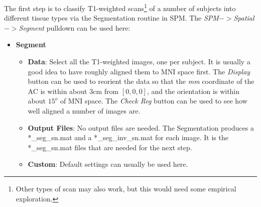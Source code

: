 The first step is to classify T1-weighted scans\footnote{Other types of scan may also work, but this would need some empirical exploration.} of a number of subjects into different tissue types via the Segmentation routine in SPM.
The \emph{SPM$->$Spatial$->$Segment} pulldown can be used here:
\begin{itemize}
\item{{\bf Segment}
  \begin{itemize}
  \item{{\bf Data}: Select all the T1-weighted images, one per subject.  It is usually a good idea to have roughly aligned them to MNI space first.  The \emph{Display} button can be used to reorient the data so that the \emph{mm} coordinate of the AC is within about 3cm from $[0, 0, 0]$, and the orientation is within about $15^o$ of MNI space.  The \emph{Check Reg} button can be used to see how well aligned a number of images are.
  }
  \item{{\bf Output Files}: No output files are needed.  The Segmentation produces a *\_seg\_sn.mat and a *\_seg\_inv\_sn.mat for each image.  It is the *\_seg\_sn.mat files that are needed for the next step.
  }
  \item{{\bf Custom}: Default settings can usually be used here.
  }
  \end{itemize}
}
\end{itemize}

